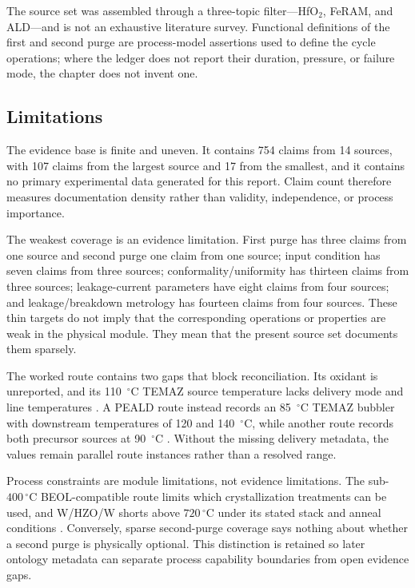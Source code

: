 \documentclass[11pt,a4paper]{report}
\begin{document}
The source set was assembled through a three-topic filter---HfO$_2$, FeRAM, and ALD---and is not an exhaustive literature survey. Functional definitions of the first and second purge are process-model assertions used to define the cycle operations; where the ledger does not report their duration, pressure, or failure mode, the chapter does not invent one.

\subsection{Limitations}
\label{sec:ald-limitations}

The evidence base is finite and uneven. It contains 754 claims from 14 sources, with 107 claims from the largest source and 17 from the smallest, and it contains no primary experimental data generated for this report. Claim count therefore measures documentation density rather than validity, independence, or process importance.

The weakest coverage is an evidence limitation. First purge has three claims from one source and second purge one claim from one source; input condition has seven claims from three sources; conformality/uniformity has thirteen claims from three sources; leakage-current parameters have eight claims from four sources; and leakage/breakdown metrology has fourteen claims from four sources. These thin targets do not imply that the corresponding operations or properties are weak in the physical module. They mean that the present source set documents them sparsely.

The worked route contains two gaps that block reconciliation. Its oxidant is unreported, and its 110~$^\circ$C TEMAZ source temperature lacks delivery mode and line temperatures \cite{tsai2022stress}. A PEALD route instead records an 85~$^\circ$C TEMAZ bubbler with downstream temperatures of 120 and 140~$^\circ$C, while another route records both precursor sources at 90~$^\circ$C \cite{choi2025purge,kashir2021wake}. Without the missing delivery metadata, the values remain parallel route instances rather than a resolved range.

Process constraints are module limitations, not evidence limitations. The sub-$400\,^{\circ}$C BEOL-compatible route limits which crystallization treatments can be used, and W/HZO/W shorts above $720\,^{\circ}$C under its stated stack and anneal conditions \cite{silva2023road,neuber2022peald,kashir2021wake}. Conversely, sparse second-purge coverage says nothing about whether a second purge is physically optional. This distinction is retained so later ontology metadata can separate process capability boundaries from open evidence gaps.
\end{document}
